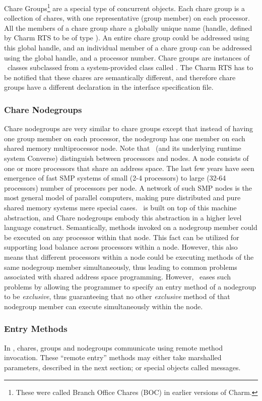 {Chare Groups\footnote{ These were called Branch Office Chares (BOC) in earlier
versions of Charm.} are a special type of concurrent objects.  Each chare group
is a collection of chares, with one representative (group member) on each
processor. All the members of a chare group share a globally unique name
(handle, defined by Charm RTS to be of type ). An entire chare
group could be addressed using this global handle, and an individual member of
a chare group can be addressed using the global handle, and a processor number.
Chare groups are instances of \CC\ classes subclassed from a system-provided
class called . The Charm RTS has to be notified that these chares
are semantically different, and therefore chare groups have a different
declaration in the interface specification file.

\subsubsection{Chare Nodegroups}

Chare nodegroups are very similar to chare groups except that instead of having
one group member on each processor, the nodegroup has one member on each shared
memory multiprocessor node. Note that \charmpp\ (and its underlying runtime
system Converse) distinguish between processors and nodes. A node consists of
one or more processors that share an address space. The last few years have
seen emergence of fast SMP systems of small (2-4 processors) to large (32-64
processors) number of processors per node. A network of such SMP nodes is the
most general model of parallel computers, making pure distributed and pure
shared memory systems mere special cases. \charmpp\ is built on top of this
machine abstraction, and Chare nodegroups embody this abstraction in a higher
level language construct. Semantically, methods invoked on a nodegroup member
could be executed on any processor within that node. This fact can be utilized
for supporting load balance across processors within a node. However, this also
means that different processors within a node could be executing methods of the
same nodegroup member simultaneously, thus leading to common problems
associated with shared address space programming. However, \charmpp\ eases such
problems by allowing the programmer to specify an entry method of a nodegroup
to be {\em exclusive}, thus guaranteeing that no other {\em exclusive} method
of that nodegroup member can execute simultaneously within the node.

\subsubsection{Entry Methods}
In \charmpp, chares, groups and 
nodegroups communicate using remote method invocation.  These ``remote entry'' methods may either take marshalled parameters, described in the next section; or special objects called messages.

}
